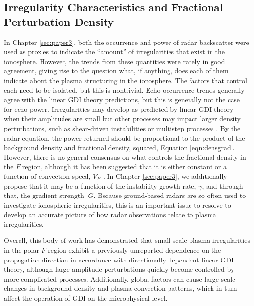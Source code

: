 \subsection{Irregularity Characteristics and Fractional Perturbation Density}
\label{sec:fw_fracdens}
In Chapter \ref{sec:paper3}, both the occurrence and power of radar backscatter were used as proxies to indicate the ``amount'' of irregularities that exist in the ionosphere.  However, the trends from these quantities were rarely in good agreement, giving rise to the question what, if anything, does each of them indicate about the plasma structuring in the ionosphere.  The factors that control each need to be isolated, but this is nontrivial.  Echo occurrence trends generally agree with the linear GDI theory predictions, but this is generally not the case for echo power.  Irregularities may develop as predicted by linear GDI theory when their amplitudes are small but other processes may impact larger density perturbations, such as shear-driven instabilities \citep{Gondarenko2006} or multistep processes \citep{Carlson2012}.  By the radar equation, the power returned should be proportional to the product of the background density and fractional density, squared, Equation \ref{eqn:densgrad}.  However, there is no general consensus on what controls the fractional density in the \(F\) region, although it has been suggested that it is either constant or a function of convection speed, \(V_E\) \citep{Kustov1988,Haldoupis1990,Makarevich2014b}.  In Chapter \ref{sec:paper3}, we additionally propose that it may be a function of the instability growth rate, \(\gamma\), and through that, the gradient strength, \(G\).  Because ground-based radars are so often used to investigate ionospheric irregularities, this is an important issue to resolve to develop an accurate picture of how radar observations relate to plasma irregularities.

Overall, this body of work has demonstrated that small-scale plasma irregularities in the polar \(F\) region exhibit a previously unreported dependence on the propagation direction in accordance with directionally-dependent linear GDI theory, although large-amplitude perturbations quickly become controlled by more complicated processes.  Additionally, global factors can cause large-scale changes in background density and plasma convection patterns, which in turn affect the operation of GDI on the microphysical level.




